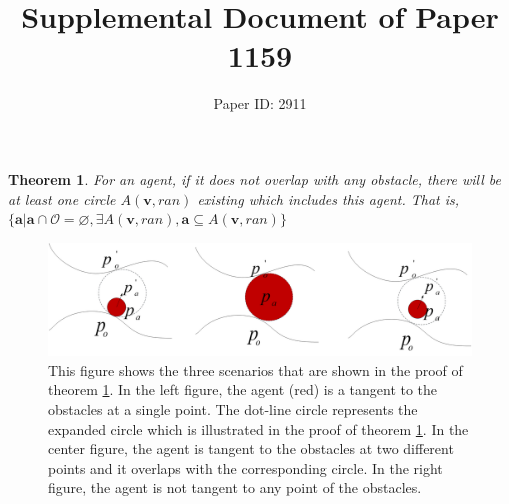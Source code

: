 \documentclass[letterpaper]{article}
\newtheorem{theorem}{Theorem}
\theoremstyle{definition}
\theoremstyle{plain}
\theoremstyle{definition}
\theoremstyle{remark}
\begin{document}
%
\title{Supplemental Document of Paper 1159}
\author{Paper ID: 2911}
\maketitle
\begin{theorem}
For an agent, if it does not overlap with any obstacle, there will be at least one circle $A(\mathbf v,ran)$ existing which includes this agent. That is, $\{\mathbf{a} | \mathbf{a} \cap \mathcal{O} = \varnothing, \exists{ A(\mathbf v,ran)}, \mathbf{a} \subseteq  A(\mathbf v,ran)\}$
\label{thm:included}
\end{theorem}


\begin{figure}[!ht]
\centering
\includegraphics[width=1\linewidth]{figs/include.png}
\caption{This figure shows the three scenarios that are shown in the proof of theorem \ref{thm:included}. In the left figure, the agent (red) is a tangent to the obstacles at a single point. The dot-line circle represents the expanded circle which is illustrated in the proof of theorem \ref{thm:included}.
In the center figure, the agent is tangent to the obstacles at two different points and it overlaps with the corresponding circle. In the right figure, the agent is not tangent to any point of the obstacles.
}
\label{fig:include}
\end{figure}
\end{document}
